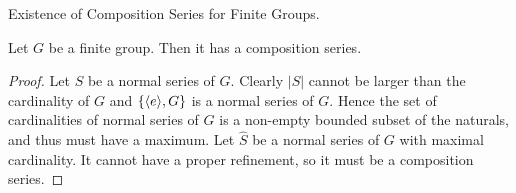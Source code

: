 \documentclass[../../book.tex]{subfiles}
\begin{document}
\begin{thm} Existence of Composition Series for Finite Groups.
    
    Let $G$ be a finite group.
    Then it has a composition series.
    
\end{thm}
\begin{proof}
    
    Let $S$ be a normal series of $G$.
    Clearly $|S|$ cannot be larger than the cardinality of $G$
    and $\{\langle e\rangle,G\}$ is a normal series of $G$.
    Hence the set of cardinalities of normal series of $G$ is a non-empty
    bounded subset of the naturals, and thus must have a maximum. 
    Let $\hat{S}$ be a normal series of $G$ with maximal cardinality. 
    It cannot have a proper refinement, so it must be a composition series.
    
\end{proof}
\end{document}
